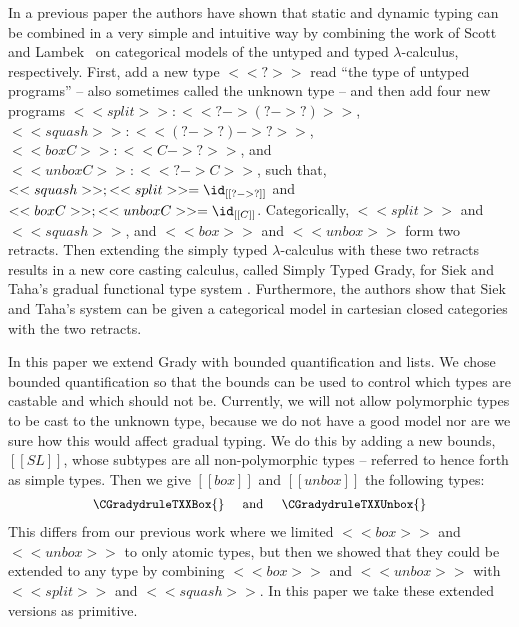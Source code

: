 In a previous paper the authors \cite{Eades:2017} have shown that
static and dynamic typing can be combined in a very simple and
intuitive way by combining the work of Scott~\cite{Scott:1980} and
Lambek~\cite{Lambek:1980} on categorical models of the untyped and
typed $\lambda$-calculus, respectively.  First, add a new type $<<?>>$
read ``the type of untyped programs'' -- also sometimes called the
unknown type -- and then add four new programs
$<<split>> : <<? -> (? -> ?)>>$, $ <<squash>> : <<(? -> ?) -> ?>> $,
$<<box C>> : <<C -> ?>>$, and $<<unbox C>> : <<? -> C>>$, such that,
$<<squash>>;<<split>> = \id_{[[? -> ?]]}$ and
$<<box C>>;<<unbox C>> = \id_{[[C]]}$.
Categorically, $<<split>>$ and $<<squash>>$, and $<<box>>$ and
$<<unbox>>$ form two retracts.  Then extending the simply typed
$\lambda$-calculus with these two retracts results in a new core
casting calculus, called Simply Typed Grady, for Siek and Taha's
gradual functional type system \cite{Siek:2015}.  Furthermore, the
authors show that Siek and Taha's system can be given a categorical
model in cartesian closed categories with the two retracts.

In this paper we extend Grady with bounded quantification and lists.
We chose bounded quantification so that the bounds can be used to
control which types are castable and which should not be.  Currently,
we will not allow polymorphic types to be cast to the unknown type,
because we do not have a good model nor are we sure how this would
affect gradual typing.  We do this by adding a new bounds, $[[SL]]$,
whose subtypes are all non-polymorphic types -- referred to hence
forth as simple types.  Then we give $[[box]]$ and $[[unbox]]$ the
following types:
\[\small
\begin{array}{lll}
  \CGradydruleTXXBox{} & \text{ and } & \CGradydruleTXXUnbox{}
\end{array}
\]
This differs from our previous work where we limited $<<box>>$ and
$<<unbox>>$ to only atomic types, but then we showed that they could
be extended to any type by combining $<<box>>$ and $<<unbox>>$ with
$<<split>>$ and $<<squash>>$.  In this paper we take these extended
versions as primitive.

